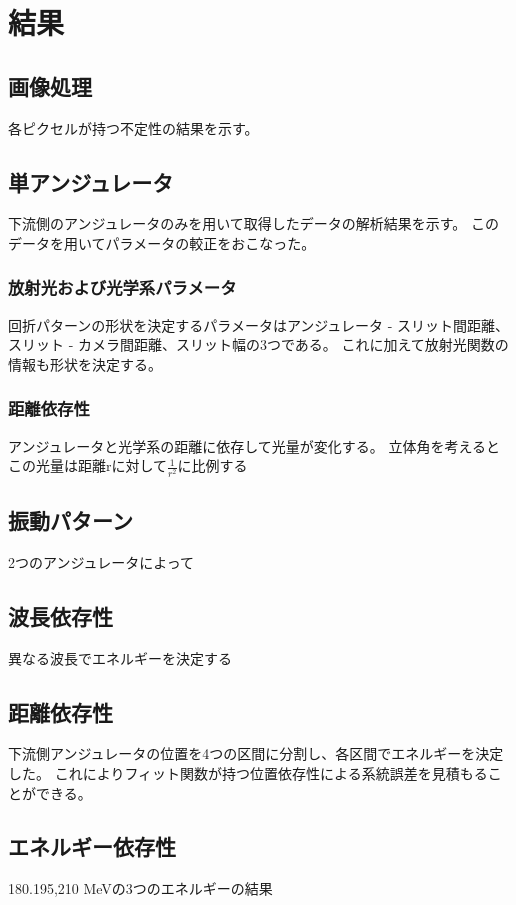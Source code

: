 \documentclass[a4paper,11pt,uplatex]{jsarticle}
\begin{document}
\section{結果}
\subsection{画像処理}
各ピクセルが持つ不定性の結果を示す。

\subsection{単アンジュレータ}
下流側のアンジュレータのみを用いて取得したデータの解析結果を示す。
このデータを用いてパラメータの較正をおこなった。

\subsubsection{放射光および光学系パラメータ}
回折パターンの形状を決定するパラメータはアンジュレータ - スリット間距離、スリット - カメラ間距離、スリット幅の3つである。
これに加えて放射光関数の情報も形状を決定する。

\subsubsection{距離依存性}
アンジュレータと光学系の距離に依存して光量が変化する。
立体角を考えるとこの光量は距離rに対して$\frac{1}{r^2}$に比例する

\subsection{振動パターン}
2つのアンジュレータによって

\subsection{波長依存性}
異なる波長でエネルギーを決定する

\subsection{距離依存性}
下流側アンジュレータの位置を4つの区間に分割し、各区間でエネルギーを決定した。
これによりフィット関数が持つ位置依存性による系統誤差を見積もることができる。

\subsection{エネルギー依存性}
180.195,210 MeVの3つのエネルギーの結果
\end{document}
